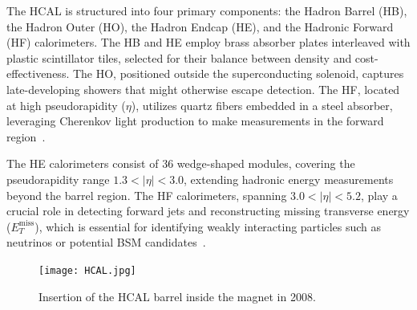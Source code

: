 The HCAL is structured into four primary components: the Hadron Barrel (HB), the Hadron Outer (HO), the Hadron Endcap (HE), and the Hadronic Forward (HF) calorimeters. The HB and HE employ brass absorber plates interleaved with plastic scintillator tiles, selected for their balance between density and cost-effectiveness. The HO, positioned outside the superconducting solenoid, captures late-developing showers that might otherwise escape detection. The HF, located at high pseudorapidity (\(\eta\)), utilizes quartz fibers embedded in a steel absorber, leveraging Cherenkov light production to make measurements in the forward region~\cite{CMS-HCAL-Performance}.

The HE calorimeters consist of 36 wedge-shaped modules, covering the pseudorapidity range \(1.3 < |\eta| < 3.0\), extending hadronic energy measurements beyond the barrel region. The HF calorimeters, spanning \(3.0 < |\eta| < 5.2\), play a crucial role in detecting forward jets and reconstructing missing transverse energy (\(E_T^{\text{miss}}\)), which is essential for identifying weakly interacting particles such as neutrinos or potential BSM candidates~\cite{CMS-Trigger-Performance}.

\begin{figure}[!hbt]
    \begin{center}
        \texttt{[image: HCAL.jpg]}
        \caption{Insertion of the HCAL barrel inside the magnet in 2008.}
        \label{fig:HCAL}
    \end{center}
\end{figure}




